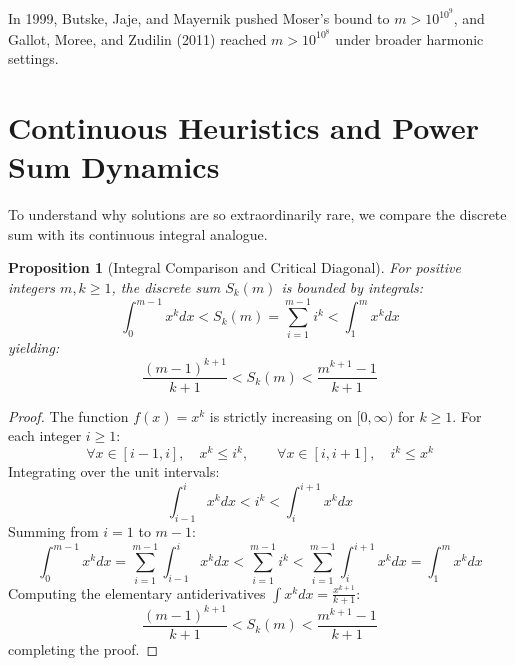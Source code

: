 \documentclass[11pt,a4paper]{article}
\newtheorem{proposition}[theorem]{Proposition}
\theoremstyle{definition}
\begin{document}
In 1999, Butske, Jaje, and Mayernik \cite{butske1999} pushed Moser's bound to $m > 10^{10^9}$, and Gallot, Moree, and Zudilin (2011) \cite{gallot2011} reached $m > 10^{10^8}$ under broader harmonic settings.

\section{Continuous Heuristics and Power Sum Dynamics}

To understand why solutions are so extraordinarily rare, we compare the discrete sum with its continuous integral analogue.

\begin{proposition}[Integral Comparison and Critical Diagonal]\label{prop:integral}
For positive integers $m, k \ge 1$, the discrete sum $S_k(m)$ is bounded by integrals:
\begin{equation}\label{eq:integral_bound}
\int_0^{m-1} x^k dx < S_k(m) = \sum_{i=1}^{m-1} i^k < \int_1^m x^k dx
\end{equation}
yielding:
\begin{equation}\label{eq:integral_eval}
\frac{(m-1)^{k+1}}{k+1} < S_k(m) < \frac{m^{k+1} - 1}{k+1}
\end{equation}
\end{proposition}

\begin{proof}
The function $f(x) = x^k$ is strictly increasing on $[0, \infty)$ for $k \ge 1$.
For each integer $i \ge 1$:
\[ \forall x \in [i-1, i], \quad x^k \le i^k, \qquad \forall x \in [i, i+1], \quad i^k \le x^k \]
Integrating over the unit intervals:
\[ \int_{i-1}^i x^k dx < i^k < \int_i^{i+1} x^k dx \]
Summing from $i = 1$ to $m-1$:
\[ \int_0^{m-1} x^k dx = \sum_{i=1}^{m-1} \int_{i-1}^i x^k dx < \sum_{i=1}^{m-1} i^k < \sum_{i=1}^{m-1} \int_i^{i+1} x^k dx = \int_1^m x^k dx \]
Computing the elementary antiderivatives $\int x^k dx = \frac{x^{k+1}}{k+1}$:
\[ \frac{(m-1)^{k+1}}{k+1} < S_k(m) < \frac{m^{k+1} - 1}{k+1} \]
completing the proof.
\end{proof}
\end{document}
